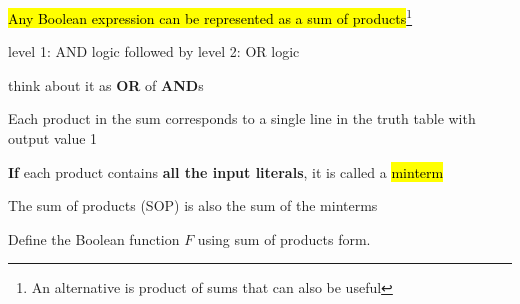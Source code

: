 \begin{frame}[fragile]
\begin{itemize}
	\item \hl{Any Boolean expression can be represented as a sum of
		products}\footnote{An alternative is product of sums that can also be useful} 
 {\footnotesize \item level 1: AND logic followed by level 2: OR logic 
 \item think about it as \textbf{OR} of \textbf{AND}s
  }
	\item Each product in the sum corresponds to a single
		line in the truth table with output value 1
  \item \textbf{If} each product contains \textbf{all the input literals}, it is called a \hl{minterm} 
    \item The sum of products (SOP) is also the sum of the minterms 
 \end{itemize}


 


  
\begin{tcolorbox}[enhanced,attach boxed title to top center={yshift=-3mm,yshifttext=-1mm},
  colback=red!5!white,colframe=red!75!black,colbacktitle=red!80!black,
  title=Try this,fonttitle=\bfseries,
  boxed title style={size=small,colframe=red!50!black} ]
  Define the Boolean function $F$ using sum of products form.  
{\footnotesize
\begin{center}


\end{center}}
\end{tcolorbox}
\end{frame}
